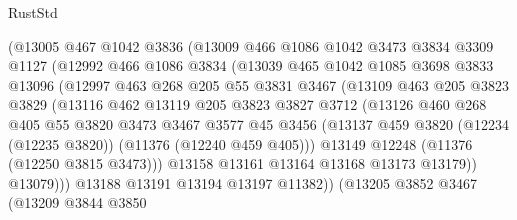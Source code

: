 \begin{lexlean}{RustStd}
\begin{coremodule}
{\begin{coremodule}
{{{{{{{{{{{{{{{{{{{{{{{{{{{{{{{{{{{{{{{{{{{{{{{{{{{{{{{{{{{{{{{{{{{{{{{{{{{{{{{{{{{{{                (@13005
                  @467
                  @1042
                  @3836
                  (@13009
                    @466
                    @1086
                    @1042
                    @3473
                    @3834
                    @3309
                    @1127
                    (@12992
                      @466
                      @1086
                      @3834
                      (@13039
                        @465
                        @1042
                        @1085
                        @3698
                        @3833
                        @13096
                        (@12997
                          @463
                          @268
                          @205
                          @55
                          @3831
                          @3467
                          (@13109
                            @463
                            @205
                            @3823
                            @3829
                            (@13116
                              @462
                              @13119
                              @205
                              @3823
                              @3827
                              @3712
                              (@13126
                                @460
                                @268
                                @405
                                @55
                                @3820
                                @3473
                                @3467
                                @3577
                                @45
                                @3456
                                (@13137
                                  @459
                                  @3820
                                  (@12234 (@12235 @3820))
                                  (@11376 (@12240 @459 @405)))
                                @13149
                                @12248
                                (@11376 (@12250 @3815 @3473)))
                              @13158
                              @13161
                              @13164
                              @13168
                              @13173
                              @13179))
                          @13079)))
                    @13188
                    @13191
                    @13194
                    @13197
                    @11382))
                (@13205
                  @3852
                  @3467
                  (@13209
                    @3844
                    @3850
}}}}}}}}}}}}}}}}}}}}}}}}}}}}}}}}}}}}}}}}}}}}}}}}}}}}}}}}}}}}}}}}}}}}}}}}}}}}}}}}}}}}}
\end{coremodule}}
\end{coremodule}
\end{lexlean}
